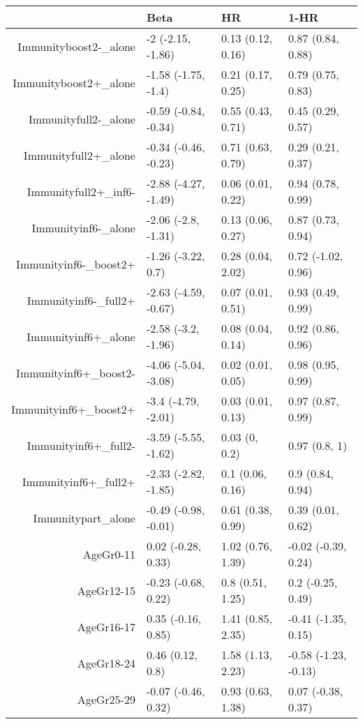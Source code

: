 \begin{table}[ht]
\centering
\begin{tabular}{rlll}
  \hline
 & Beta & HR & 1-HR \\ 
  \hline
Immunityboost2-\_alone & -2 (-2.15, -1.86) & 0.13 (0.12, 0.16) & 0.87 (0.84, 0.88) \\ 
  Immunityboost2+\_alone & -1.58 (-1.75, -1.4) & 0.21 (0.17, 0.25) & 0.79 (0.75, 0.83) \\ 
  Immunityfull2-\_alone & -0.59 (-0.84, -0.34) & 0.55 (0.43, 0.71) & 0.45 (0.29, 0.57) \\ 
  Immunityfull2+\_alone & -0.34 (-0.46, -0.23) & 0.71 (0.63, 0.79) & 0.29 (0.21, 0.37) \\ 
  Immunityfull2+\_inf6- & -2.88 (-4.27, -1.49) & 0.06 (0.01, 0.22) & 0.94 (0.78, 0.99) \\ 
  Immunityinf6-\_alone & -2.06 (-2.8, -1.31) & 0.13 (0.06, 0.27) & 0.87 (0.73, 0.94) \\ 
  Immunityinf6-\_boost2+ & -1.26 (-3.22, 0.7) & 0.28 (0.04, 2.02) & 0.72 (-1.02, 0.96) \\ 
  Immunityinf6-\_full2+ & -2.63 (-4.59, -0.67) & 0.07 (0.01, 0.51) & 0.93 (0.49, 0.99) \\ 
  Immunityinf6+\_alone & -2.58 (-3.2, -1.96) & 0.08 (0.04, 0.14) & 0.92 (0.86, 0.96) \\ 
  Immunityinf6+\_boost2- & -4.06 (-5.04, -3.08) & 0.02 (0.01, 0.05) & 0.98 (0.95, 0.99) \\ 
  Immunityinf6+\_boost2+ & -3.4 (-4.79, -2.01) & 0.03 (0.01, 0.13) & 0.97 (0.87, 0.99) \\ 
  Immunityinf6+\_full2- & -3.59 (-5.55, -1.62) & 0.03 (0, 0.2) & 0.97 (0.8, 1) \\ 
  Immunityinf6+\_full2+ & -2.33 (-2.82, -1.85) & 0.1 (0.06, 0.16) & 0.9 (0.84, 0.94) \\ 
  Immunitypart\_alone & -0.49 (-0.98, -0.01) & 0.61 (0.38, 0.99) & 0.39 (0.01, 0.62) \\ 
  AgeGr0-11 & 0.02 (-0.28, 0.33) & 1.02 (0.76, 1.39) & -0.02 (-0.39, 0.24) \\ 
  AgeGr12-15 & -0.23 (-0.68, 0.22) & 0.8 (0.51, 1.25) & 0.2 (-0.25, 0.49) \\ 
  AgeGr16-17 & 0.35 (-0.16, 0.85) & 1.41 (0.85, 2.35) & -0.41 (-1.35, 0.15) \\ 
  AgeGr18-24 & 0.46 (0.12, 0.8) & 1.58 (1.13, 2.23) & -0.58 (-1.23, -0.13) \\ 
  AgeGr25-29 & -0.07 (-0.46, 0.32) & 0.93 (0.63, 1.38) & 0.07 (-0.38, 0.37) \\ 

\end{tabular}
\end{table}

